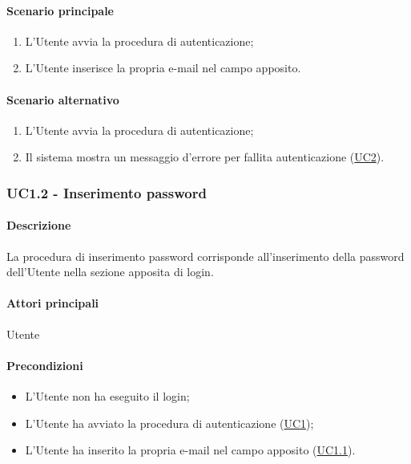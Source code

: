 \paragraph*{Scenario principale}
\begin{enumerate}
  \item L’Utente avvia la procedura di autenticazione;
  \item L’Utente inserisce la propria e-mail nel campo apposito.  
\end{enumerate}

\paragraph*{Scenario alternativo}
\begin{enumerate}
  \item L'Utente avvia la procedura di autenticazione;
  \item Il sistema mostra un messaggio d'errore per fallita autenticazione (\hyperref[UC2]{UC2}).
\end{enumerate}


\subsubsection{UC1.2 - Inserimento password}\label{UC1point2}
\paragraph*{Descrizione}
La procedura di inserimento password corrisponde all’inserimento della password dell'Utente nella sezione apposita di login.

\paragraph*{Attori principali}
Utente

\paragraph*{Precondizioni}
\begin{itemize}
  \item L’Utente non ha eseguito il login;
  \item L’Utente ha avviato la procedura di autenticazione (\hyperref[UC1]{UC1});
  \item L’Utente ha inserito la propria e-mail nel campo apposito (\hyperref[UC1point1]{UC1.1}).
\end{itemize}

